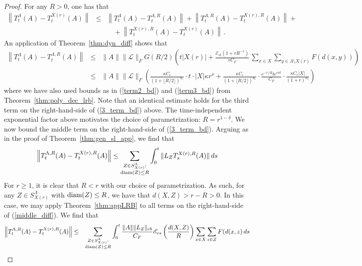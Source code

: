 \documentclass{article}
\newcommand{\E}{\mathscr{E}}
\newcommand{\<}{\langle}
\renewcommand{\>}{\rangle}
\numberwithin{equation}{section}
\theoremstyle{definition}
\begin{document}
    \begin{proof}
For any $R>0$, one has that
\begin{eqnarray} \label{3_term_bd}
 \left\|T^{\Lambda}_t(A)-T^{X(r)}_t(A) \right\| & \leq & \left\|T^{\Lambda}_t(A)-T^{\Lambda, R}_t(A) \right\| +  \left\| T^{\Lambda, R}_t(A)-T^{X(r), R}_t(A) \right\| +  \nonumber \\
& \mbox{ } & \quad +  \left\|T^{X(r), R}_t(A) -T^{X(r)}_t(A) \right\| \, .
\end{eqnarray}
An application of Theorem~\ref{thm:dyn_diff} shows that
\begin{eqnarray}
\left\|T^{\Lambda}_t(A)-T^{\Lambda, R}_t(A) \right\| & \leq & \|A\| \| \mathscr{L} \|_F G(R/2) \left( t |X(r)| + \frac{\E_{vt}(1+ rR^{-1})}{v C_F} \,
        \sum_{x \in X} \sum_{y \in \Lambda \setminus X(r)} F(d(x,y)) \right)  \\
        & \leq & \| A \| \| \mathscr{L} \|_F \left( \frac{ \kappa C_{\epsilon}}{(1+ \lfloor R/2 \rfloor)^{\alpha_{\epsilon}}} \cdot t \cdot |X| \kappa r^{\nu} + 
        \frac{ \kappa C_{\epsilon}}{(1+ \lfloor R/2 \rfloor)^{\alpha_{\epsilon}}}  \cdot \frac{e^{-r/R} t e^{evt}}{C_F} \cdot \frac{ \kappa C_{\epsilon}|X|}{(1+ r)^{\alpha_{\epsilon}}}\right) \nonumber
\end{eqnarray}
where we have also used bounds as in (\ref{term2_bd}) and (\ref{term3_bd}) from Theorem~\ref{thm:poly_dec_lrb}. 
Note that an identical estimate holds for the third term on the right-hand-side of (\ref{3_term_bd}) above. The time-independent 
exponential factor above motivates the choice of parametrization: $R = r^{1- \delta}$. We now bound the middle term on the
right-hand-side of (\ref{3_term_bd}). Arguing as in the proof of Theorem~\ref{thm:gen_sl_app}, we find that
\begin{equation} \label{middle_diff}
\left\| T^{\Lambda, R}_t(A)-T^{X(r), R}_t(A) \right\| \leq \sum_{\substack{Z \in S^{\Lambda}_{X(r)}: \\ {\rm diam}(Z) \leq R}} \int_0^t \| L_Z T_s^{X(r), R}(A) \| \, ds 
\end{equation}
For $r \geq 1$, it is clear that $R<r$ with our choice of parametrization. As such, for any $Z \in S^{\Lambda}_{X(r)}$ with ${\rm diam}(Z) \leq R$, we have that
$d(X,Z) > r-R>0$. In this case, we may apply Theorem~\ref{thm:appLRB} to all terms on the right-hand-side of (\ref{middle_diff}). We find that
\begin{eqnarray}
\left\| T^{\Lambda, R}_t(A)-T^{X(r), R}_t(A) \right\| & \leq &
\sum_{\substack{Z \in S^{\Lambda}_{X(r)}: \\ {\rm diam}(Z) \leq R}} \int_0^t  \frac{\| A \| \| L_Z \|_{cb} }{C_F}  \E_{vs}\left( \frac{d(X,Z)}{R} \right)  \sum_{x \in X}  \sum_{z \in Z} F(d(x,z) \, ds \nonumber \\

\end{eqnarray}
\end{proof}
\end{document}
